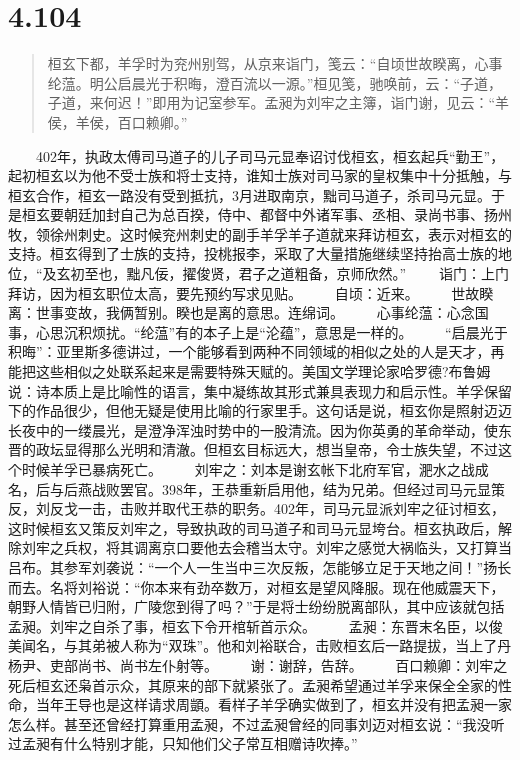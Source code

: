 \documentclass[]{book}
\begin{document}
\section{4.104}\label{section-279}

\begin{quote}
桓玄下都，羊孚时为兖州别驾，从京来诣门，笺云：``自顷世故睽离，心事纶蕰。明公启晨光于积晦，澄百流以一源。''桓见笺，驰唤前，云：``子道，子道，来何迟！''即用为记室参军。孟昶为刘牢之主簿，诣门谢，见云：``羊侯，羊侯，百口赖卿。''
\end{quote}

　　402年，执政太傅司马道子的儿子司马元显奉诏讨伐桓玄，桓玄起兵``勤王''，起初桓玄以为他不受士族和将士支持，谁知士族对司马家的皇权集中十分抵触，与桓玄合作，桓玄一路没有受到抵抗，3月进取南京，黜司马道子，杀司马元显。于是桓玄要朝廷加封自己为总百揆，侍中、都督中外诸军事、丞相、录尚书事、扬州牧，领徐州刺史。这时候兖州刺史的副手羊孚羊子道就来拜访桓玄，表示对桓玄的支持。桓玄得到了士族的支持，投桃报李，采取了大量措施继续坚持抬高士族的地位，``及玄初至也，黜凡佞，擢俊贤，君子之道粗备，京师欣然。''
　　诣门：上门拜访，因为桓玄职位太高，要先预约写求见贴。
　　自顷：近来。
　　世故睽离：世事变故，我俩暂别。睽也是离的意思。连绵词。
　　心事纶蕰：心念国事，心思沉积烦扰。``纶蕰''有的本子上是``沦蕴''，意思是一样的。
　　``启晨光于积晦''：亚里斯多德讲过，一个能够看到两种不同领域的相似之处的人是天才，再能把这些相似之处联系起来是需要特殊天赋的。美国文学理论家哈罗德?布鲁姆说：诗本质上是比喻性的语言，集中凝练故其形式兼具表现力和启示性。羊孚保留下的作品很少，但他无疑是使用比喻的行家里手。这句话是说，桓玄你是照射迈迈长夜中的一缕晨光，是澄净浑浊时势中的一股清流。因为你英勇的革命举动，使东晋的政坛显得那么光明和清澈。但桓玄目标远大，想当皇帝，令士族失望，不过这个时候羊孚已暴病死亡。
　　刘牢之：刘本是谢玄帐下北府军官，淝水之战成名，后与后燕战败罢官。398年，王恭重新启用他，结为兄弟。但经过司马元显策反，刘反戈一击，击败并取代王恭的职务。402年，司马元显派刘牢之征讨桓玄，这时候桓玄又策反刘牢之，导致执政的司马道子和司马元显垮台。桓玄执政后，解除刘牢之兵权，将其调离京口要他去会稽当太守。刘牢之感觉大祸临头，又打算当吕布。其参军刘袭说：``一个人一生当中三次反叛，怎能够立足于天地之间！''扬长而去。名将刘裕说：``你本来有劲卒数万，对桓玄是望风降服。现在他威震天下，朝野人情皆已归附，广陵您到得了吗？''于是将士纷纷脱离部队，其中应该就包括孟昶。刘牢之自杀了事，桓玄下令开棺斩首示众。
　　孟昶：东晋末名臣，以俊美闻名，与其弟被人称为``双珠''。他和刘裕联合，击败桓玄后一路提拔，当上了丹杨尹、吏部尚书、尚书左仆射等。
　　谢：谢辞，告辞。
　　百口赖卿：刘牢之死后桓玄还枭首示众，其原来的部下就紧张了。孟昶希望通过羊孚来保全全家的性命，当年王导也是这样请求周顗。看样子羊孚确实做到了，桓玄并没有把孟昶一家怎么样。甚至还曾经打算重用孟昶，不过孟昶曾经的同事刘迈对桓玄说：``我没听过孟昶有什么特别才能，只知他们父子常互相赠诗吹捧。''
\end{document}
